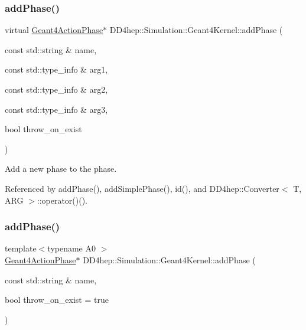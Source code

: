 \subsubsection{\texorpdfstring{add\+Phase()}{addPhase()}\hspace{0.1cm}{\footnotesize\ttfamily [1/4]}}
{\footnotesize\ttfamily virtual \hyperlink{class_d_d4hep_1_1_simulation_1_1_geant4_action_phase}{Geant4\+Action\+Phase}$\ast$ D\+D4hep\+::\+Simulation\+::\+Geant4\+Kernel\+::add\+Phase (\begin{DoxyParamCaption}\item[{const std\+::string \&}]{name,  }\item[{const std\+::type\+\_\+info \&}]{arg1,  }\item[{const std\+::type\+\_\+info \&}]{arg2,  }\item[{const std\+::type\+\_\+info \&}]{arg3,  }\item[{bool}]{throw\+\_\+on\+\_\+exist }\end{DoxyParamCaption})\hspace{0.3cm}{\ttfamily [virtual]}}



Add a new phase to the phase. 



Referenced by add\+Phase(), add\+Simple\+Phase(), id(), and D\+D4hep\+::\+Converter$<$ T, A\+R\+G $>$\+::operator()().

\hypertarget{class_d_d4hep_1_1_simulation_1_1_geant4_kernel_a9911ca521ebd05a1126fb04adbf3f0b2}{}\label{class_d_d4hep_1_1_simulation_1_1_geant4_kernel_a9911ca521ebd05a1126fb04adbf3f0b2} 
\subsubsection{\texorpdfstring{add\+Phase()}{addPhase()}\hspace{0.1cm}{\footnotesize\ttfamily [2/4]}}
{\footnotesize\ttfamily template$<$typename A0 $>$ \\
\hyperlink{class_d_d4hep_1_1_simulation_1_1_geant4_action_phase}{Geant4\+Action\+Phase}$\ast$ D\+D4hep\+::\+Simulation\+::\+Geant4\+Kernel\+::add\+Phase (\begin{DoxyParamCaption}\item[{const std\+::string \&}]{name,  }\item[{bool}]{throw\+\_\+on\+\_\+exist = {\ttfamily true} }\end{DoxyParamCaption})\hspace{0.3cm}{\ttfamily [inline]}}



